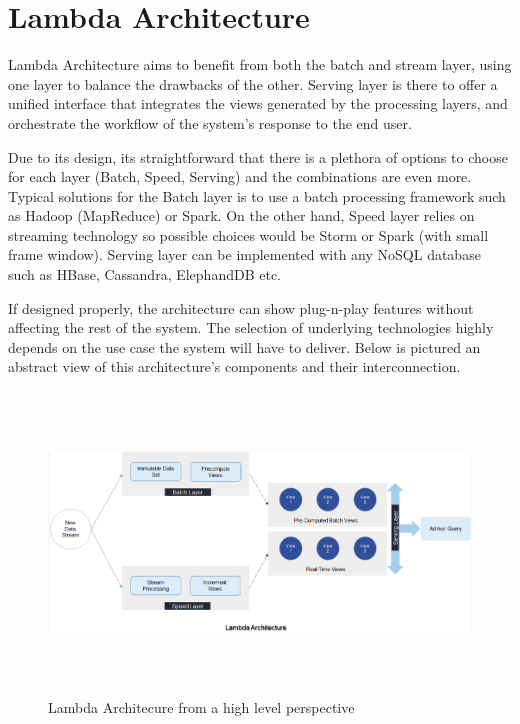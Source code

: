 \documentclass{lmproj}
\begin{document}
\section{Lambda Architecture}
\label{relatedwork}


Lambda Architecture aims to benefit from both the batch and stream layer, using one layer to balance the drawbacks of the other. Serving layer is there to offer a unified interface that integrates the views generated by the processing layers, and orchestrate the workflow of the system's response to the end user.

Due to its design, its straightforward that there is a plethora of options to choose for each layer (Batch, Speed, Serving) and the combinations are even more. Typical solutions for the Batch layer is to use a batch processing framework such as Hadoop (MapReduce) or Spark. On the other hand, Speed layer relies on streaming technology so possible choices would be Storm or Spark (with small frame window). Serving layer can be implemented with any NoSQL database such as HBase, Cassandra, ElephandDB etc.

If designed properly, the architecture can show plug-n-play features without affecting the rest of the system. The selection of underlying technologies highly depends on the use case the system will have to deliver. Below is pictured an abstract view of this architecture's components and their interconnection.

\bigskip
\begin{figure}[h]
	\centering
	\includegraphics[width=16cm, height=8cm]{la_overview}
	\caption{Lambda Architecure from a high level perspective}
\end{figure}


\end{document}
